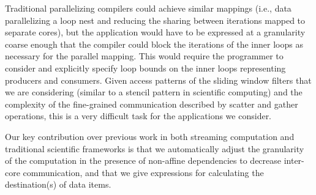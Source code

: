 Traditional parallelizing compilers could achieve similar mappings
(i.e., data parallelizing a loop nest and reducing the sharing between
iterations mapped to separate cores), but the application would have
to be expressed at a granularity coarse enough that the compiler could
block the iterations of the inner loops as necessary for the parallel
mapping.  This would require the programmer to consider and explicitly
specify loop bounds on the inner loops representing producers and
consumers.  Given access patterns of the sliding window filters that
we are considering (similar to a stencil pattern in scientific
computing) and the complexity of the fine-grained communication
described by scatter and gather operations, this is a very difficult
task for the applications we consider.

Our key contribution over previous work in both streaming computation
and traditional scientific frameworks is that we automatically adjust
the granularity of the computation in the presence of non-affine
dependencies to decrease inter-core communication, and that we give
expressions for calculating the destination(s) of data items.